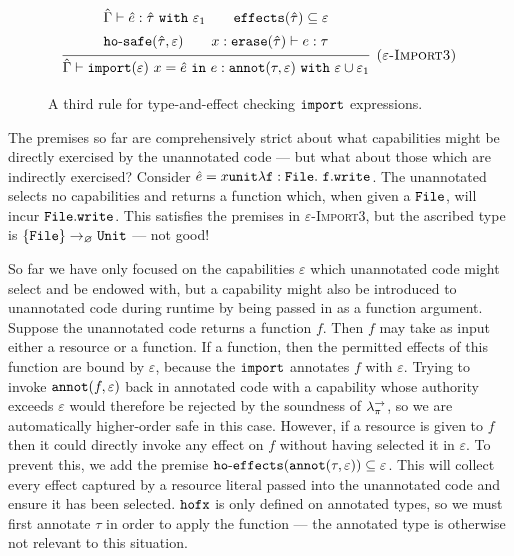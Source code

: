 \begin{figure}[h]

\noindent
{}

\[
\begin{array}{c}

\infer[\textsc{($\varepsilon$-Import3)}]
	{ \hat \Gamma \vdash \kwa{import}(\varepsilon)~x = \hat e~\kw{in} e: \kwa{annot}(\tau, \varepsilon)~\kw{with} \varepsilon \cup \varepsilon_1 }
{{\def\arraystretch{1.4}
  \begin{array}{c}
\hat \Gamma \vdash \hat e: \hat \tau~\kw{with} \varepsilon_1
~~~~~~
\kwa{effects}(\hat \tau) \subseteq \varepsilon \\
\hosafe{\hat \tau}{\varepsilon} ~~~~~~ x: \kwa{erase}(\hat \tau) \vdash e: \tau
  \end{array}}} 
 
\end{array}
\]

\vspace{-7pt}
\caption{A third rule for type-and-effect checking $\mathtt{import}$ expressions.}
\label{fig:import_rule3}
\end{figure}

The premises so far are comprehensively strict about what capabilities might be directly exercised by the unannotated code --- but what about those which are indirectly exercised? Consider $\hat e = {x}{\mathtt{unit}}{\mathtt{\lambda f: { File }.~f.write}}$. The unannotated selects no capabilities and returns a function which, when given a $\mathtt{File}$, will incur $\mathtt{File.write}$. This satisfies the premises in \textsc{$\varepsilon$-Import3}, but the ascribed type is $\{ \mathtt{File} \} \rightarrow_{\varnothing} \mathtt{Unit}$ --- not good!

So far we have only focused on the capabilities $\varepsilon$ which unannotated code might select and be endowed with, but a capability might also be introduced to unannotated code during runtime by being passed in as a function argument. Suppose the unannotated code returns a function $f$. Then $f$ may take as input either a resource or a function. If a function, then the permitted effects of this function are bound by $\varepsilon$, because the $\mathtt{import}$ annotates $f$ with $\varepsilon$. Trying to invoke $\mathtt{annot}(f, \varepsilon)$ back in annotated code with a capability whose authority exceeds $\varepsilon$ would therefore be rejected by the soundness of $\lambda^{\rightarrow}_{\pi}$, so we are automatically higher-order safe in this case. However, if a resource is given to $f$ then it could directly invoke any effect on $f$ without having selected it in $\varepsilon$. To prevent this, we add the premise $\mathtt{ho \hbox{-} effects}(\mathtt{annot}(\tau, \varepsilon)) \subseteq \varepsilon$. This will collect every effect captured by a resource literal passed into the unannotated code and ensure it has been selected. $\mathtt{hofx}$ is only defined on annotated types, so we must first annotate $\tau$ in order to apply the function --- the annotated type is otherwise not relevant to this situation.

